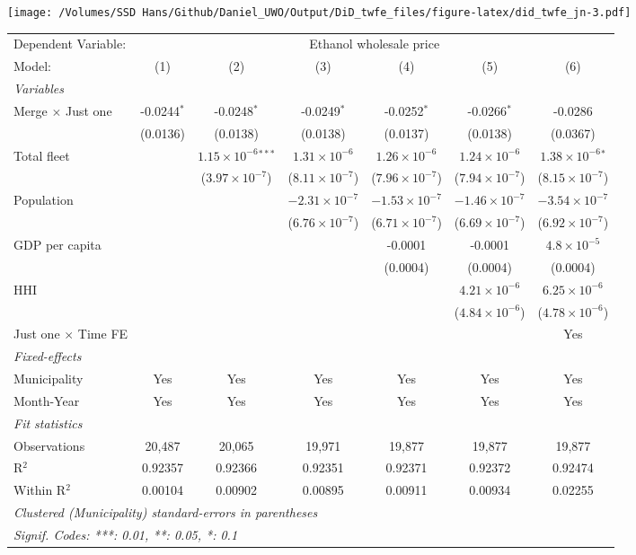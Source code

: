 \documentclass[
]{article}
\begin{document}
\texttt{[image: /Volumes/SSD Hans/Github/Daniel\_UWO/Output/DiD\_twfe\_files/figure-latex/did\_twfe\_jn-3.pdf]}

\begin{tabular}{lcccccc}
\tabularnewline\midrule\midrule
Dependent Variable:&\multicolumn{6}{c}{Ethanol wholesale price}\\
Model:&(1) & (2) & (3) & (4) & (5) & (6)\\
\midrule \emph{Variables}&   &   &   &   &   &  \\
Merge $\times $ Just one & -0.0244$^{*}$ & -0.0248$^{*}$ & -0.0249$^{*}$ & -0.0252$^{*}$ & -0.0266$^{*}$ & -0.0286\\
  &(0.0136) & (0.0138) & (0.0138) & (0.0137) & (0.0138) & (0.0367)\\
Total fleet &    & $1.15\times 10^{-6}$$^{***}$ & $1.31\times 10^{-6}$ & $1.26\times 10^{-6}$ & $1.24\times 10^{-6}$ & $1.38\times 10^{-6}$$^{*}$\\
  &   & ($3.97\times 10^{-7}$) & ($8.11\times 10^{-7}$) & ($7.96\times 10^{-7}$) & ($7.94\times 10^{-7}$) & ($8.15\times 10^{-7}$)\\
Population &    &    & $-2.31\times 10^{-7}$ & $-1.53\times 10^{-7}$ & $-1.46\times 10^{-7}$ & $-3.54\times 10^{-7}$\\
  &   &    & ($6.76\times 10^{-7}$) & ($6.71\times 10^{-7}$) & ($6.69\times 10^{-7}$) & ($6.92\times 10^{-7}$)\\
GDP per capita &    &    &    & -0.0001 & -0.0001 & $4.8\times 10^{-5}$\\
  &   &    &    & (0.0004) & (0.0004) & (0.0004)\\
HHI &    &    &    &    & $4.21\times 10^{-6}$ & $6.25\times 10^{-6}$\\
  &   &    &    &    & ($4.84\times 10^{-6}$) & ($4.78\times 10^{-6}$)\\
Just one $\times$ Time FE &  &  &  &  &  & Yes\\
\midrule \emph{Fixed-effects}&   &   &   &   &   &  \\
Municipality & Yes & Yes & Yes & Yes & Yes & Yes\\
Month-Year & Yes & Yes & Yes & Yes & Yes & Yes\\
\midrule \emph{Fit statistics}&  & & & & & \\
Observations & 20,487&20,065&19,971&19,877&19,877&19,877\\
R$^2$ & 0.92357&0.92366&0.92351&0.92371&0.92372&0.92474\\
Within R$^2$ & 0.00104&0.00902&0.00895&0.00911&0.00934&0.02255\\
\midrule\midrule\multicolumn{7}{l}{\emph{Clustered (Municipality) standard-errors in parentheses}}\\
\multicolumn{7}{l}{\emph{Signif. Codes: ***: 0.01, **: 0.05, *: 0.1}}\\
\end{tabular}
\end{document}
